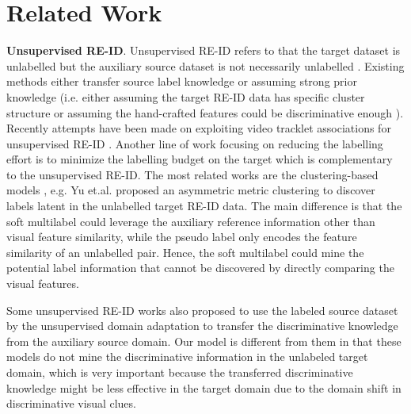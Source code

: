 \documentclass[10pt,twocolumn,letterpaper]{article}
\begin{document}
\section{Related Work}

\noindent
\textbf{Unsupervised RE-ID}.
Unsupervised RE-ID refers to that the target dataset is unlabelled
but the auxiliary source dataset is not necessarily unlabelled
\cite{2016_CVPR_tDIC,2017_Arxiv_PUL,2018_CVPR_transferable,2018_CVPR_SPGAN,2018_ECCV_HHL}.
Existing methods either transfer source label knowledge \cite{2016_CVPR_tDIC,2017_Arxiv_PUL,2018_CVPR_transferable,2018_CVPR_SPGAN,2018_ECCV_HHL}
or assuming strong prior knowledge
(i.e. either assuming the target RE-ID data has specific cluster structure \cite{2017_ICCV_asymmetric,2019_TPAMI_DECAMEL,2017_Arxiv_PUL}
or assuming the hand-crafted features could be discriminative enough \cite{2017_ICCV_asymmetric,Dic,GL,2013_CVPR_saliency,SDALF,GTS}).
Recently attempts have been made on exploiting video tracklet associations for unsupervised RE-ID \cite{2018_BMVC_tracklet,2018_ECCV_tracklet}.
Another line of work focusing on reducing the labelling effort is to minimize the labelling budget on the target \cite{2018_CVPR_transitivity}
which is complementary to the unsupervised RE-ID.
The most related works are the clustering-based models
\cite{2017_ICCV_asymmetric,2019_TPAMI_DECAMEL,2017_Arxiv_PUL},
e.g.
Yu et.al. \cite{2017_ICCV_asymmetric,2019_TPAMI_DECAMEL} proposed an asymmetric metric clustering to discover labels latent
in the unlabelled target RE-ID data.
The main difference
is that the soft multilabel could leverage the auxiliary reference information other than visual feature similarity,
while the pseudo label only encodes the feature similarity of an unlabelled pair.
Hence, the soft multilabel could mine the potential label information
that cannot be discovered by directly comparing the visual features.

Some unsupervised RE-ID works also proposed to use the labeled source dataset
by the unsupervised domain adaptation \cite{2018_CVPR_PTGAN,2018_CVPR_SPGAN,2018_ECCV_HHL,2018_CVPR_transferable}
to transfer the discriminative knowledge from the auxiliary source domain.
Our model is different from them in that
these models do not mine the discriminative information in the unlabeled target domain,
which is very important because the transferred discriminative knowledge might be less effective
in the target domain due to the domain shift \cite{2010_TKDE_survey} in discriminative visual clues.
\end{document}
